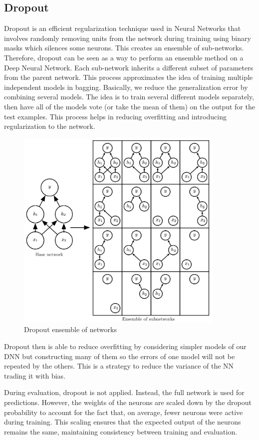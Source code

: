\newpage
\subsection{Dropout}

Dropout is an efficient regularization technique used in Neural Networks that involves randomly removing units from the network during training using binary masks which silences some neurons. This creates an ensemble of sub-networks. Therefore, dropout can be seen as a way to perform an ensemble method on a Deep Neural Network. Each sub-network inherits a different subset of parameters from the parent network. This process approximates the idea of training multiple independent models in bagging. Basically, we reduce the generalization error by combining several models. The idea is to train several different models separately, then have all of the models vote (or take the mean of them) on the output for the test examples. This process helps in reducing overfitting and introducing regularization to the network.

\begin{figure}[h]
    \centering
    \includegraphics[width=10cm]{Images/dropout.jpg}
    \caption{Dropout ensemble of networks}
    \label{fig:dropout}
\end{figure}

\noindent Dropout then is able to reduce overfitting by considering simpler models of our DNN but constructing many of them so the errors of one model will not be repeated by the others. This is a strategy to reduce the variance of the NN trading it with bias.

\noindent During evaluation, dropout is not applied. Instead, the full network is used for predictions. However,
the weights of the neurons are scaled down by the dropout probability to account for the fact that,
on average, fewer neurons were active during training. This scaling ensures that the expected output
of the neurons remains the same, maintaining consistency between training and evaluation.

